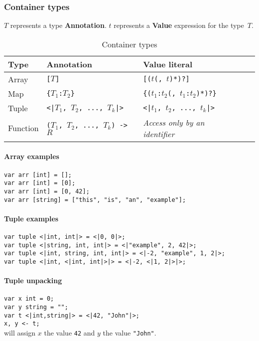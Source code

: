 \documentclass{article}
\begin{document}
\subsubsection{Container types}
$T$ represents a type \textbf{Annotation}. $t$ represents a \textbf{Value}
expression for the type~$T$.

\begin{table}[h]
\centering
\label{container-types}
\begin{tabular}{|l|l|l|l|l|} \hline
\textbf{Type} & \textbf{Annotation}                   & \textbf{Value literal}                      \\ \hline
Array         & \texttt{[$T$]}                        & \texttt{[($t$(, $t$)*)?]}                   \\ \hline
Map           & \texttt{\{$T_1$:$T_2$\}}              & \texttt{\{($t_1$:$t_2$(, $t_1$:$t_2$)*)?\}} \\ \hline
Tuple         & \texttt{<|$T_1$, $T_2$, ..., $T_k$|>} & \texttt{<|$t_1$, $t_2$, ..., $t_k$|>}       \\ \hline
Function      & \texttt{($T_1$, $T_2$, ..., $T_k$) -> $R$} & \textit{Access only by an identifier}  \\ \hline
\end{tabular}
\caption{Container types}
\end{table}

\paragraph{Array examples}
\texttt{var arr [int] = [];} \\
\texttt{var arr [int] = [0];} \\
\texttt{var arr [int] = [0, 42];} \\
\texttt{var arr [string] = ["this", "is", "an", "example"];}

\paragraph{Tuple examples}
\texttt{var tuple <|int, int|> = <|0, 0|>;} \\
\texttt{var tuple <|string, int, int|> = <|"example", 2, 42|>;} \\
\texttt{var tuple <|int, string, int, int|> = <|-2, "example", 1, 2|>;} \\
\texttt{var tuple <|int, <|int, int|>|> = <|-2, <|1, 2|>|>;}

\paragraph{Tuple unpacking}
\texttt{var x int = 0;} \\
\texttt{var y string = "";} \\
\texttt{var t <|int,string|> = <|42, "John"|>;} \\
\texttt{x, y <- t; } \\
will assign $x$ the value \texttt{42} and $y$ the value \texttt{"John"}.
\end{document}
